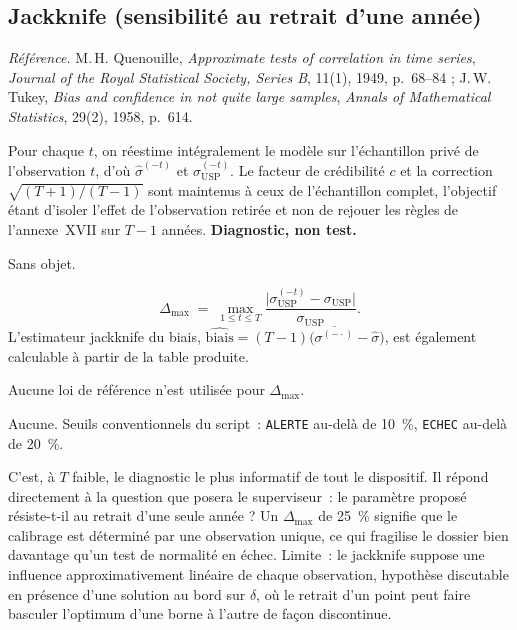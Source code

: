 \documentclass[a4paper,11pt]{article}
\newcommand{\code}[1]{\texttt{\small #1}}
\newcommand{\refl}[1]{{\small\textcolor{maincolor!70!black}{\textit{Référence.} #1}}\par\smallskip}
\newcounter{ficheid}
\newenvironment{fiche}[1]{%
  \stepcounter{ficheid}%
  \phantomsection
  \subsection{#1}%
  \label{fiche:\theficheid}%
}{%
  \end{description}\vspace{0.5em}%
}
\newcommand{\Cadre}{%
  \begin{description}[leftmargin=0pt, style=unboxed, itemsep=3pt, topsep=3pt, parsep=2pt]%
  \item[\textcolor{financeblue}{\textbf{1. Cadre, notations et hypothèses de validité (non testées).}}]}
\newcommand{\Hzero}{\item[\textcolor{financeblue}{\textbf{2. Hypothèse nulle.}}]}
\newcommand{\Stat}{\item[\textcolor{financeblue}{\textbf{3. Statistique de test.}}]}
\newcommand{\Loi}{\item[\textcolor{financeblue}{\textbf{4. Loi sous $H_0$.}}]}
\newcommand{\Pval}{\item[\textcolor{financeblue}{\textbf{5. p-value.}}]}
\newcommand{\Usage}{\item[\textcolor{financeblue}{\textbf{6. Usage et limites.}}]}
\begin{document}
\begin{fiche}{Jackknife (sensibilité au retrait d'une année)}
\refl{M.\,H. Quenouille, \emph{Approximate tests of correlation in time series}, \emph{Journal of
the Royal Statistical Society, Series B}, 11(1), 1949, p.~68--84 ; J.\,W. Tukey, \emph{Bias and
confidence in not quite large samples}, \emph{Annals of Mathematical Statistics}, 29(2), 1958,
p.~614.}
\Cadre
Pour chaque $t$, on réestime intégralement le modèle sur l'échantillon privé de l'observation $t$,
d'où $\hat\sigma^{(-t)}$ et $\sigma_{\mathrm{USP}}^{(-t)}$. Le facteur de crédibilité $c$ et la
correction $\sqrt{(T+1)/(T-1)}$ sont maintenus à ceux de l'échantillon complet, l'objectif étant
d'isoler l'effet de l'observation retirée et non de rejouer les règles de l'annexe~XVII sur $T-1$
années. \textbf{Diagnostic, non test.}
\Hzero
Sans objet.
\Stat
\[
  \Delta_{\max} \;=\; \max_{1\le t\le T}
  \frac{\big|\sigma_{\mathrm{USP}}^{(-t)} - \sigma_{\mathrm{USP}}\big|}{\sigma_{\mathrm{USP}}} .
\]
L'estimateur jackknife du biais,
$\widehat{\mathrm{biais}} = (T-1)\big(\overline{\sigma^{(-\cdot)}} - \hat\sigma\big)$, est
également calculable à partir de la table produite.
\Loi
Aucune loi de référence n'est utilisée pour $\Delta_{\max}$.
\Pval
Aucune. Seuils conventionnels du script~: \code{ALERTE} au-delà de 10~\%, \code{ECHEC} au-delà de
20~\%.
\Usage
C'est, à $T$ faible, le diagnostic le plus informatif de tout le dispositif. Il répond directement
à la question que posera le superviseur~: le paramètre proposé résiste-t-il au retrait d'une seule
année ? Un $\Delta_{\max}$ de 25~\% signifie que le calibrage est déterminé par une observation
unique, ce qui fragilise le dossier bien davantage qu'un test de normalité en échec. Limite~: le
jackknife suppose une influence approximativement linéaire de chaque observation, hypothèse
discutable en présence d'une solution au bord sur $\delta$, où le retrait d'un point peut faire
basculer l'optimum d'une borne à l'autre de façon discontinue.
\end{fiche}
\end{document}
